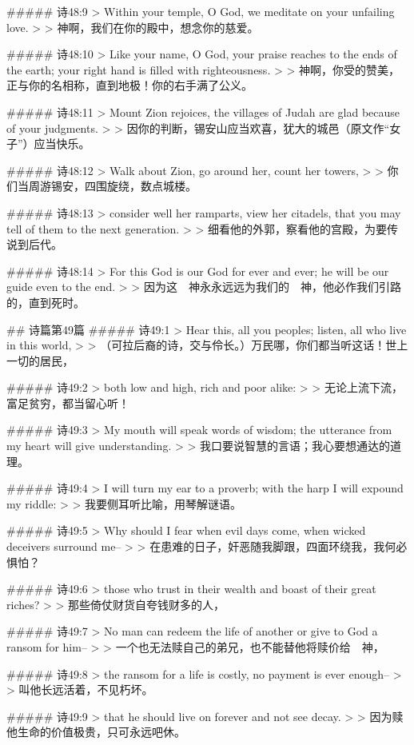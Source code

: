 ##### 诗48:9
> Within your temple, O God, we meditate on your unfailing love.
>
> 神啊，我们在你的殿中，想念你的慈爱。


##### 诗48:10
> Like your name, O God, your praise reaches to the ends of the earth; your right hand is filled with righteousness.
>
> 神啊，你受的赞美，正与你的名相称，直到地极！你的右手满了公义。


##### 诗48:11
> Mount Zion rejoices, the villages of Judah are glad because of your judgments.
>
> 因你的判断，锡安山应当欢喜，犹大的城邑（原文作“女子”）应当快乐。


##### 诗48:12
> Walk about Zion, go around her, count her towers,
>
> 你们当周游锡安，四围旋绕，数点城楼。


##### 诗48:13
> consider well her ramparts, view her citadels, that you may tell of them to the next generation.
>
> 细看他的外郭，察看他的宫殿，为要传说到后代。


##### 诗48:14
> For this God is our God for ever and ever; he will be our guide even to the end.
>
> 因为这　神永永远远为我们的　神，他必作我们引路的，直到死时。


## 诗篇第49篇
##### 诗49:1
> Hear this, all you peoples; listen, all who live in this world,
>
> （可拉后裔的诗，交与伶长。）万民哪，你们都当听这话！世上一切的居民，


##### 诗49:2
> both low and high, rich and poor alike:
>
> 无论上流下流，富足贫穷，都当留心听！


##### 诗49:3
> My mouth will speak words of wisdom; the utterance from my heart will give understanding.
>
> 我口要说智慧的言语；我心要想通达的道理。


##### 诗49:4
> I will turn my ear to a proverb; with the harp I will expound my riddle:
>
> 我要侧耳听比喻，用琴解谜语。


##### 诗49:5
> Why should I fear when evil days come, when wicked deceivers surround me--
>
> 在患难的日子，奸恶随我脚跟，四面环绕我，我何必惧怕？


##### 诗49:6
> those who trust in their wealth and boast of their great riches?
>
> 那些倚仗财货自夸钱财多的人，


##### 诗49:7
> No man can redeem the life of another or give to God a ransom for him--
>
> 一个也无法赎自己的弟兄，也不能替他将赎价给　神，


##### 诗49:8
> the ransom for a life is costly, no payment is ever enough--
>
> 叫他长远活着，不见朽坏。


##### 诗49:9
> that he should live on forever and not see decay.
>
> 因为赎他生命的价值极贵，只可永远吧休。


